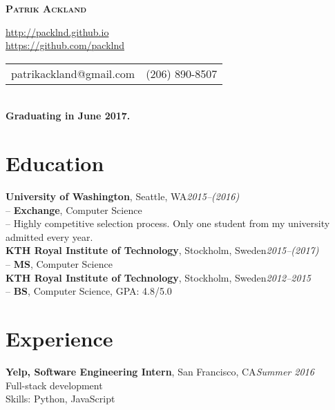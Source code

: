 \documentclass[10pt]{article}
\begin{document}

\centerline{\LARGE \textbf{\textsc{Patrik Ackland}}}

\begin{center}
  \url{http://packlnd.github.io}\\
  \vspace{0.3em}
  \url{https://github.com/packlnd}\\
  \vspace{0.3em}
  \begin{tabular}{l r}
    patrikackland@gmail.com&(206) 890-8507
  \end{tabular} \\
  \vspace{0.3em}
  \textbf{Graduating in June 2017.}
\end{center}

\section*{Education}
\vspace{0.1em}
\hline
\vspace{0.3em}
\noindent\textbf{University of Washington}, Seattle, WA\hfill\textit{2015--(2016)}\\
\indent-- \textbf{Exchange}, Computer Science\\
\indent-- Highly competitive selection process. Only one student from my university admitted every year.\\

\noindent\textbf{KTH Royal Institute of Technology}, Stockholm, Sweden\hfill\textit{2015--(2017)}\\
\indent-- \textbf{MS}, Computer Science\\

\noindent\textbf{KTH Royal Institute of Technology}, Stockholm, Sweden\hfill\textit{2012--2015}\\
\indent-- \textbf{BS}, Computer Science, GPA: 4.8/5.0\\

\section*{Experience}
\vspace{0.1em}
\hline
\vspace{0.3em}
\noindent\textbf{Yelp, Software Engineering Intern}, San Francisco, CA\hfill\textit{Summer 2016}\\
\indent Full-stack development \\
\indent Skills: Python, JavaScript\\
\end{document}
